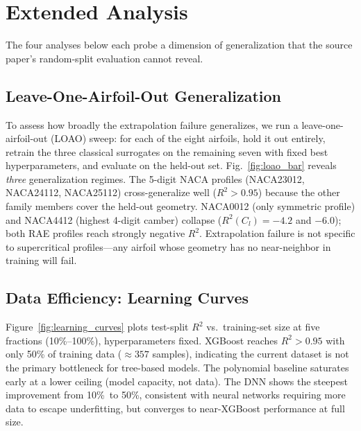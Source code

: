 \documentclass[11pt]{article}
\begin{document}
\section{Extended Analysis}

The four analyses below each probe a dimension of generalization that the
source paper's random-split evaluation cannot reveal.

\subsection{Leave-One-Airfoil-Out Generalization}

To assess how broadly the extrapolation failure generalizes, we run a
leave-one-airfoil-out (LOAO) sweep: for each of the eight airfoils, hold
it out entirely, retrain the three classical surrogates on the remaining
seven with fixed best hyperparameters, and evaluate on the held-out set.
Fig.~\ref{fig:loao_bar} reveals \emph{three} generalization regimes.
The 5-digit NACA profiles (NACA23012, NACA24112, NACA25112) cross-generalize
well ($R^2 > 0.95$) because the other family members cover the held-out geometry.
NACA0012 (only symmetric profile) and NACA4412 (highest 4-digit camber) collapse
($R^2(C_l) = -4.2$ and $-6.0$); both RAE profiles reach strongly negative $R^2$.
Extrapolation failure is not specific to supercritical profiles---any airfoil
whose geometry has no near-neighbor in training will fail.

\subsection{Data Efficiency: Learning Curves}

Figure~\ref{fig:learning_curves} plots test-split $R^2$ vs.\ training-set
size at five fractions (10\%--100\%), hyperparameters fixed. XGBoost reaches
$R^2 > 0.95$ with only 50\% of training data ($\approx357$ samples),
indicating the current dataset is not the primary bottleneck for tree-based
models. The polynomial baseline saturates early at a lower ceiling (model
capacity, not data). The DNN shows the steepest improvement from 10\%~to
50\%, consistent with neural networks requiring more data to escape
underfitting, but converges to near-XGBoost performance at full size.
\end{document}
